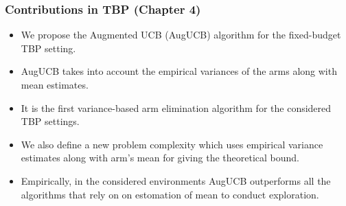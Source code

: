 \begin{frame}
\frametitle{Contributions in TBP ({Chapter 4})}
\begin{itemize}
\item<1-> We propose the Augmented UCB (AugUCB) algorithm for the fixed-budget TBP setting.
\item<2-> AugUCB takes into account the empirical variances of the arms along with mean estimates.
\item<3-> It is the first variance-based arm elimination algorithm for the considered TBP settings. 
\item<4-> We also define a new problem complexity which uses empirical variance estimates along with arm's mean for giving the theoretical bound.
\item<5-> Empirically, in the considered environments AugUCB outperforms all the algorithms that rely on on estomation of mean to conduct exploration.
\end{itemize}
\end{frame}


%


